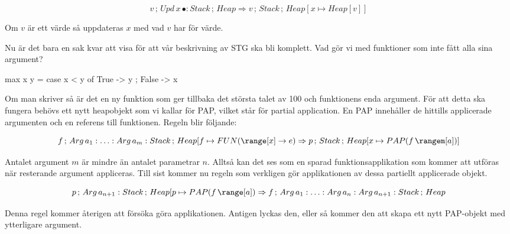 \documentclass[../Core]{subfiles}
\begin{document}
\[
v\,;\, Upd\, x\,\bullet:Stack\,;\, Heap\Rightarrow v\,;\, Stack\,;\, Heap[x\mapsto Heap[v]]\]

Om $v$ är ett värde så uppdateras $x$ med vad $v$ har för värde.

Nu är det bara en sak kvar att visa för att vår beskrivning av STG ska bli komplett.
Vad gör vi med funktioner som inte fått alla sina argument?

\begin{codeEx}
max x y = case x < y of
    { True  -> y
    ; False -> x
    }
\end{codeEx}

Om man skriver  så är det en ny funktion som
ger tillbaka det största talet av 100 och funktionens enda argument. För att
detta ska fungera behövs ett nytt heapobjekt som vi kallar för PAP, vilket står för partial
application. En PAP innehåller de hittills applicerade argumenten och en referens till funktionen.
Regeln blir följande:

\[
f\,;\, Arg\, a_{1}:\ldots:Arg\, a_{m}:Stack\,;\, Heap[f\mapsto\FUN{\range[x]}e\Rightarrow p\,;\, Stack\,;\, Heap[x\mapsto\PAP f{\rangem[a]}]\]


Antalet argument $m$ är mindre än antalet parametrar $n$.
Alltså kan det ses som en sparad funktionsapplikation som kommer att
utföras när resterande argument appliceras. Till sist kommer nu
regeln som verkligen gör applikationen av dessa partiellt applicerade
objekt.

\[
p\,;\, Arg\, a_{n+1}:Stack\,;\, Heap[p\mapsto\PAP f{\range[a]}\Rightarrow f\,;\, Arg\, a_{1}:\ldots:Arg\, a_{n}:Arg\, a_{n+1}:Stack\,;\, Heap\]


Denna regel kommer återigen att försöka göra applikationen. Antigen lyckas
den, eller så kommer den att skapa ett nytt PAP-objekt med ytterligare
argument.
\end{document}
